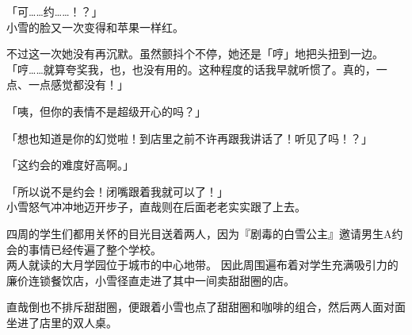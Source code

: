 「可……约……！？」\\

小雪的脸又一次变得和苹果一样红。

不过这一次她没有再沉默。虽然颤抖个不停，她还是「哼」地把头扭到一边。\\

「哼……就算夸奖我，也，也没有用的。这种程度的话我早就听惯了。真的，一点、一点感觉都没有！」

「咦，但你的表情不是超级开心的吗？」

「想也知道是你的幻觉啦！到店里之前不许再跟我讲话了！听见了吗！？」

「这约会的难度好高啊。」

「所以说不是约会！闭嘴跟着我就可以了！」\\

小雪怒气冲冲地迈开步子，直哉则在后面老老实实跟了上去。

四周的学生们都用关怀的目光目送着两人，因为『剧毒的白雪公主』邀请男生A约会的事情已经传遍了整个学校。\\

两人就读的大月学园位于城市的中心地带。
因此周围遍布着对学生充满吸引力的廉价连锁餐饮店，小雪径直走进了其中一间卖甜甜圈的店。

直哉倒也不排斥甜甜圈，便跟着小雪也点了甜甜圈和咖啡的组合，然后两人面对面坐进了店里的双人桌。\\

